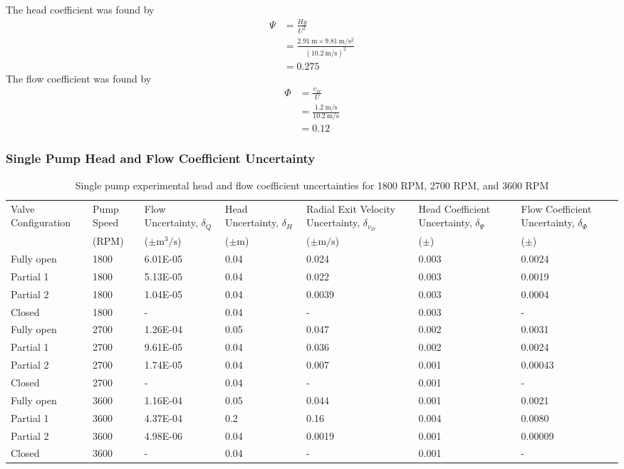 The head coefficient was found by
\begin{align*}
    \Psi &= \frac{Hg}{U^2} \\
    &= \frac{\qty{2.91}{\meter} \times \qty{9.81}{\meter\per\second\squared}}{(\qty{10.2}{\meter\per\second})^2} \\
    &= 0.275
\end{align*}
The flow coefficient was found by
\begin{align*}
    \Phi &= \frac{v_{2r}}{U} \\
    &= \frac{\qty{1.2}{\meter\per\second}}{\qty{10.2}{\meter\per\second}} \\
    &= 0.12
\end{align*}
\subsubsection{Single Pump Head and Flow Coefficient Uncertainty}
\begin{table}[h]
    \centering
    \caption{Single pump experimental head and flow coefficient uncertainties for 1800 RPM, 2700 RPM, and 3600 RPM} 
    \begin{tabular}{lC{0.10\textwidth}C{0.10\textwidth}C{0.10\textwidth}C{0.10\textwidth}C{0.10\textwidth}C{0.10\textwidth}}
    \toprule
    Valve Configuration & Pump Speed & Flow Uncertainty, $\delta_Q$ & Head Uncertainty, $\delta_{H}$ & Radial Exit Velocity Uncertainty, $\delta_{v_{2r}}$ & Head Coefficient Uncertainty, $\delta_{\Psi}$ & Flow Coefficient Uncertainty, $\delta_{\Phi}$ \\
    & (RPM) & ($\pm\unit{\meter\cubed\per\second}$) & ($\pm$m) & ($\pm\unit{\meter\per\second}$) & ($\pm$) & ($\pm$) \\
    \midrule
    Fully open & 1800 & 6.01E-05 & 0.04 & 0.024 & 0.003 & 0.0024 \\
    Partial 1 & 1800 & 5.13E-05 & 0.04 & 0.022 & 0.003 & 0.0019 \\
    Partial 2 & 1800 & 1.04E-05 & 0.04 & 0.0039 & 0.003 & 0.0004 \\
    Closed & 1800 & - & 0.04 & - & 0.003 & - \\
    Fully open & 2700 & 1.26E-04 & 0.05 & 0.047 & 0.002 & 0.0031 \\
    Partial 1 & 2700 & 9.61E-05 & 0.04 & 0.036 & 0.002 & 0.0024 \\
    Partial 2 & 2700 & 1.74E-05 & 0.04 & 0.007 & 0.001 & 0.00043 \\
    Closed & 2700 & - & 0.04 & - & 0.001 & - \\
    Fully open & 3600 & 1.16E-04 & 0.05 & 0.044 & 0.001 & 0.0021 \\
    Partial 1 & 3600 & 4.37E-04 & 0.2 & 0.16 & 0.004 & 0.0080 \\
    Partial 2 & 3600 & 4.98E-06 & 0.04 & 0.0019 & 0.001 & 0.00009 \\
    Closed & 3600 & - & 0.04 & - & 0.001 & - \\
    \bottomrule
    \end{tabular}
\end{table}
